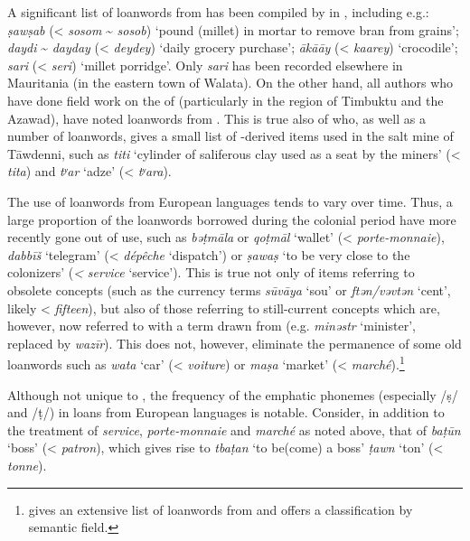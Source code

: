 \documentclass[output=paper]{langsci/langscibook}
\begin{document}
A significant list of {loanwords} from  has been compiled by \citet{Heath2004} in , including e.g.: \textit{ṣawṣab} (< \textit{sosom} \~{} \textit{sosob}) ‘pound (millet) in mortar to remove bran from grains’; \textit{daydi} \~{} \textit{dayday} (< \textit{deydey}) ‘daily grocery purchase’; \textit{ākā{\R}āy} (< \textit{kaarey}) ‘crocodile’; \textit{sari} (< \textit{seri}) ‘millet porridge’. Only \textit{sari} has been recorded elsewhere in Mauritania (in the eastern town of Walata). On the other hand, all authors who have done field work on the  of  (particularly in the region of Timbuktu and the Azawad), have noted {loanwords} from . This is true also of \citet{Clauzel1960} who, as well as a number of  {loanwords}, gives a small list of -derived items used in the salt mine of Tāwdenni, such as \textit{titi} ‘cylinder of saliferous clay used as a seat by the miners’ (< \textit{tita}) and \textit{tʸar} ‘adze’ (< \textit{tʸara}).


The use of {loanwords} from European languages tends to vary over time. Thus, a large proportion of the  {loanwords} borrowed during the {colonial} period have more recently gone out of use, such as \textit{bə{\R}ṭmāla} or \textit{qo{\R}ṭmāl} ‘wallet’ (< \textit{porte-monnaie}), \textit{dabbīš} ‘telegram’ (< \textit{dépêche} ‘dispatch’) or \textit{ṣa{\R}waṣ} ‘to be very close to the colonizers’ (\textit{<} \textit{service} ‘service’). This is true not only of items referring to obsolete concepts (such as the currency terms \textit{sūvāya} ‘sou’ or \textit{ftən/vəvtən} ‘cent’, likely < \textit{fifteen}), but also of those referring to still-current concepts which are, however, now referred to with a term drawn from   (e.g. \textit{minəstr} ‘minister’, replaced by \textit{wazīr}). This does not, however, eliminate the permanence of some old {loanwords} such as \textit{wata} ‘car’ (< \textit{voiture}) or \textit{ma{\R}ṣa} ‘market’ (< \textit{marché}).\footnote{\citet{OuldMohamedBaba2003} gives an extensive list of {loanwords} from  and offers a classification by semantic field.}

Although not unique to , the {frequency} of the {emphatic} phonemes (especially /ṣ/ and /ṭ/) in loans from European languages is notable. Consider, in addition to the treatment of \textit{service}, \textit{porte-monnaie} and \textit{marché} as noted above, that of \textit{baṭ{\R}ūn} ‘boss’ (< \textit{patron}), which gives rise to \textit{tbaṭ{\R}an} ‘to be(come) a boss’ \textit{ṭawn} ‘ton’ (< \textit{tonne}).
\end{document}
